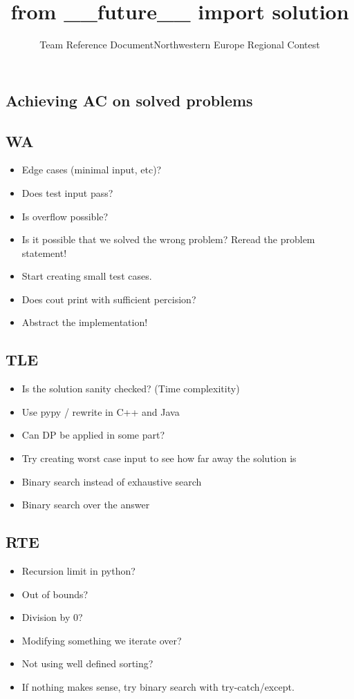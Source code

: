 \documentclass[8pt,a4paper,landscape,oneside]{amsart}
\title{from \_\_future\_\_ import solution}
\subtitle{Team Reference Document}
\subtitle{Northwestern Europe Regional Contest}
\author{}
\date{\ddmmyyyydate{2018-11-25}}
\begin{document}
\begin{multicols*}{2}
\maketitle
\thispagestyle{fancy}
\vspace{-3em}

\tableofcontents
\begin{large}
\section{Achieving AC on solved problems}
\subsection{WA}
\begin{itemize}
    \item Edge cases (minimal input, etc)?
    \item Does test input pass?
    \item Is overflow possible?
    \item Is it possible that we solved the wrong problem? Reread the problem statement!
    \item Start creating small test cases.
    \item Does cout print with sufficient percision?
    \item Abstract the implementation!
\end{itemize}
\subsection{TLE}
\begin{itemize}
    \item Is the solution sanity checked? (Time complexitity)
    \item Use pypy / rewrite in C++ and Java
    \item Can DP be applied in some part?
    \item Try creating worst case input to see how far away the solution is
    \item Binary search instead of exhaustive search
    \item Binary search over the answer
\end{itemize}
\subsection{RTE}
\begin{itemize}
    \item Recursion limit in python?
    \item Out of bounds?
    \item Division by 0?
    \item Modifying something we iterate over?
    \item Not using well defined sorting?
    \item If nothing makes sense, try binary search with try-catch/except.
\end{itemize}

\end{large}
\end{multicols*}
\end{document}
